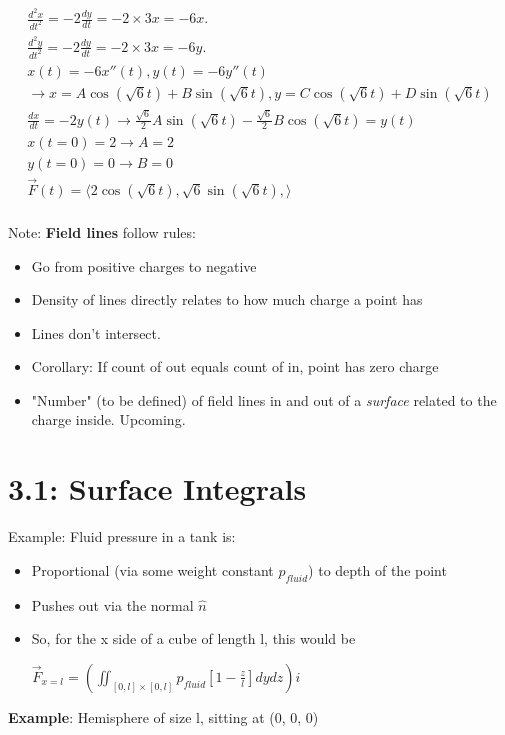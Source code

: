 \documentclass[11pt, oneside]{article}   	%
\begin{document}
\begin{align}
\frac{d^2x}{dt^2} = -2 \frac{dy}{dt}= -2 \times 3x = -6x.\\
\frac{d^2y}{dt^2} = -2 \frac{dy}{dt}= -2 \times 3x = -6y.\\
x(t) = -6x''(t), y(t) = -6y''(t) \\
\rightarrow x = A\cos(\sqrt{6}t)+ B\sin(\sqrt{6}t),  y = C\cos(\sqrt{6}t)+ D\sin(\sqrt{6}t) \\
\frac{dx}{dt} = -2y(t) \rightarrow   \frac{\sqrt{6}}{2}A\sin(\sqrt{6}t)- \frac{\sqrt{6}}{2}B\cos(\sqrt{6}t)  = y(t) \\
x(t=0) = 2 \rightarrow A = 2 \\
y(t=0) = 0 \rightarrow B = 0 \\
\overrightarrow{F}(t) = \langle 2\cos(\sqrt{6}t), \sqrt{6}\sin(\sqrt{6}t),\rangle \\
\end{align}

Note: \textbf{Field lines} follow rules:
\begin{itemize}
\item Go from positive charges to negative
\item Density of lines directly relates to how much charge a point has
\item Lines don't intersect.
\item Corollary: If count of out equals count of in, point has zero charge
\item "Number" (to be defined) of field lines in and out of a \emph{surface} related to the charge inside.  Upcoming.
\end{itemize}

\section{3.1: Surface Integrals}

Example: Fluid pressure in a tank is:
\begin{itemize}
\item Proportional (via some weight constant $p_{fluid}$) to depth of the point
\item Pushes out via the normal $\hat{n}$ 
\item So, for the x side of a cube of length l, this would be 

$\overrightarrow{F}_{x=l} = (\iint_{[0,l] \times [0,l]} p_{fluid} [1 - \frac{z}{l}] dy dz) \hat{i}$
\end{itemize}

\textbf{Example}: Hemisphere of size l, sitting at (0, 0, 0)
\end{document}
